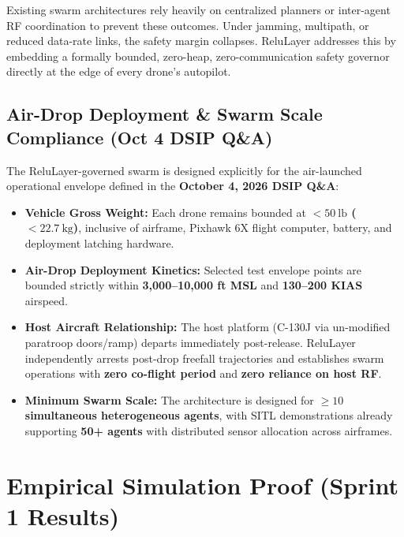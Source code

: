 \documentclass[11pt]{article}
\begin{document}
Existing swarm architectures rely heavily on centralized planners or inter-agent RF coordination to prevent these outcomes. Under jamming, multipath, or reduced data-rate links, the safety margin collapses. ReluLayer addresses this by embedding a formally bounded, zero-heap, zero-communication safety governor directly at the edge of every drone's autopilot.

\subsection[Air-Drop \& Swarm Scale Compliance]{Air-Drop Deployment \& Swarm Scale Compliance (Oct 4 DSIP Q\&A)}
\label{subsec:qa}

The ReluLayer-governed swarm is designed explicitly for the air-launched operational envelope defined in the \textbf{October 4, 2026 DSIP Q\&A}:

\begin{itemize}[leftmargin=*]
    \item \textbf{Vehicle Gross Weight:} Each drone remains bounded at \textbf{$< 50\ \text{lb}$ ($< 22.7\ \text{kg}$)}, inclusive of airframe, Pixhawk 6X flight computer, battery, and deployment latching hardware.
    \item \textbf{Air-Drop Deployment Kinetics:} Selected test envelope points are bounded strictly within \textbf{3,000--10,000 ft MSL} and \textbf{130--200 KIAS} airspeed.
    \item \textbf{Host Aircraft Relationship:} The host platform (C-130J via un-modified paratroop doors/ramp) departs immediately post-release. ReluLayer independently arrests post-drop freefall trajectories and establishes swarm operations with \textbf{zero co-flight period} and \textbf{zero reliance on host RF}.
    \item \textbf{Minimum Swarm Scale:} The architecture is designed for \textbf{$\ge 10$ simultaneous heterogeneous agents}, with SITL demonstrations already supporting \textbf{50+ agents} with distributed sensor allocation across airframes.
\end{itemize}

\section{Empirical Simulation Proof (Sprint 1 Results)}
\label{sec:sprint1}
\end{document}
